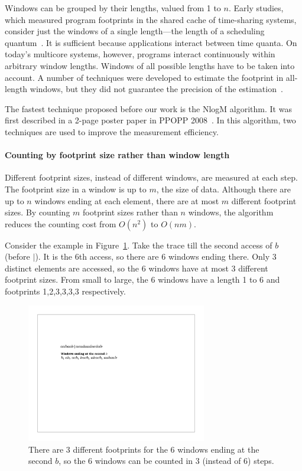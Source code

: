 Windows can be grouped by their lengths, valued from 1 to $n$. Early
studies, which measured program footprints in the shared cache of time-sharing
systems, consider just the windows of a single length---the length of
a scheduling quantum~\cite{ThiebautS:TOCS87,Stone+:TOC92}. It is
sufficient because applications interact between time quanta.
On today's multicore systems, however, programs interact continuously
within arbitrary window lengths. Windows of all possible lengths have
to be taken into account. A number of techniques were developed to estimate the footprint in
all-length windows, but they did not guarantee the precision of the
estimation~\cite{Suh+:ICS01,Chandra+:HPCA05,BergH:SIGMETRICS05,Shen+:POPL07,ShenS:LCPC08,DingC:MSR09}.

The fastest technique proposed before our work is the NlogM algorithm.
It was first described in a 2-page poster paper in PPOPP
2008~\cite{DingC:PPOPP08}. In  this algorithm, two techniques are used
to improve the measurement efficiency. 

\paragraph{Counting by footprint size rather than window length} Different footprint
sizes, instead of different windows, are measured at each step. The
footprint size in a window is up to $m$, the size of data.  Although
there are up to $n$ windows ending at each element, there are at most $m$ different footprint sizes.  By counting $m$ footprint sizes rather
than $n$ windows, the algorithm reduces the counting cost from
$O(n^2)$ to $O(nm)$.

Consider the example in Figure~\ref{fig:fp-illus1}.  Take the trace till the
second access of $b$ (before $|$).  It is the 6th access, so there
are 6 windows ending there.  Only 3 distinct elements are accessed, so
the 6 windows have at most 3 different footprint sizes.  From small to large, the 6 windows
have a length 1 to 6 and footprints 1,2,3,3,3,3 respectively.

\begin{figure}[h!]
  \centering
  \includegraphics[width=0.7\textwidth]{figures/fp/pact09-illustration1}
  \caption{There are 3 different footprints for the 6 windows ending
    at the second $b$, so the 6 windows can be counted in 3 (instead of 6) steps.}
\label{fig:fp-illus1}
\end{figure}


